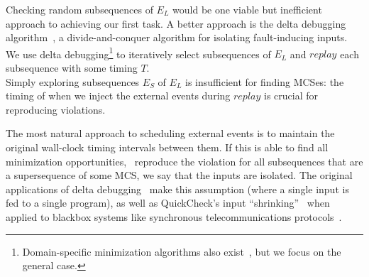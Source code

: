  Checking
random subsequences of $E_L$ would be one viable but inefficient
approach to achieving our first task. A better approach is
the delta debugging algorithm~\cite{Zeller:1999:YMP:318773.318946,Zeller:2002:SIF:506201.506206}, a
divide-and-conquer algorithm for
isolating fault-inducing inputs. We use delta
debugging\footnote{Domain-specific
minimization algorithms also
exist~\cite{regehr2012test,claessen2000quickcheck,whitaker2004configuration},
but we focus on the general case.} to iteratively select subsequences of $E_L$ and $replay$ each
subsequence with some timing $T$.\\[0.5ex]
%
 Simply
exploring subsequences $E_S$ of $E_L$ is insufficient for finding
MCSes: the timing of when we inject the external events during $replay$ is crucial for
reproducing violations.

The most natural approach to scheduling
external events is to maintain the original wall-clock timing intervals
between them.
If this is able to find all minimization opportunities,
\ie~reproduce the violation for all
subsequences that are a supersequence of some MCS, we say that the inputs are
isolated. The original applications of delta
debugging~\cite{Zeller:1999:YMP:318773.318946,Zeller:2002:SIF:506201.506206,regehr2012test,burger2011minimizing} make this assumption (where a
single input is fed to a single program), as well as QuickCheck's input ``shrinking''~\cite{claessen2000quickcheck}
when applied to blackbox systems like synchronous
telecommunications protocols~\cite{arts2006testing}.

